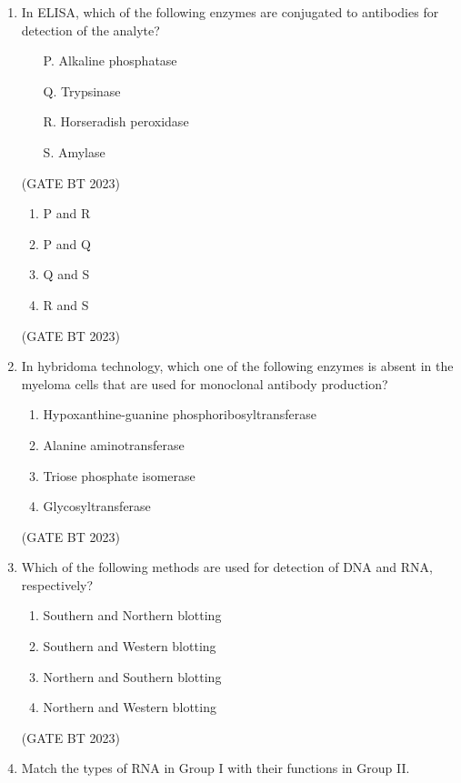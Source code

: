 \documentclass[journal,12pt,onecolumn]{IEEEtran}
\begin{document}
\begin{enumerate}
    \item In ELISA, which of the following enzymes are conjugated to antibodies for detection of the analyte?
    \begin{enumerate}
        \item[P.] Alkaline phosphatase
        \item[Q.] Trypsinase
        \item[R.] Horseradish peroxidase
        \item[S.] Amylase
    \end{enumerate}\hfill(GATE BT 2023)
    \begin{enumerate}
        \item P and R
        \item P and Q
        \item Q and S
        \item R and S
    \end{enumerate}
    \hfill(GATE BT 2023)

    \item In hybridoma technology, which one of the following enzymes is absent in the myeloma cells that are used for monoclonal antibody production?
    \begin{enumerate}
        \item Hypoxanthine-guanine phosphoribosyltransferase
        \item Alanine aminotransferase
        \item Triose phosphate isomerase
        \item Glycosyltransferase
    \end{enumerate}
    \hfill(GATE BT 2023)

    \item Which of the following methods are used for detection of DNA and RNA, respectively?
    \begin{enumerate}
        \item Southern and Northern blotting
        \item Southern and Western blotting
        \item Northern and Southern blotting
        \item Northern and Western blotting
    \end{enumerate}
    \hfill(GATE BT 2023)

    \item Match the types of RNA in Group I with their functions in Group II.
    \begin{table}[H]
    \begin{tabular}{ll}
    

\end{tabular}
\end{table}
\end{enumerate}
\end{document}
